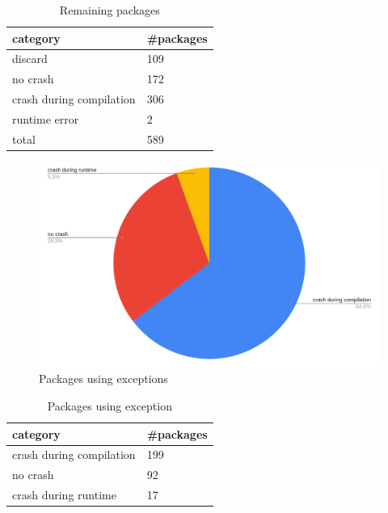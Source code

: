\documentclass[a4paper,11pt,oneside]{report}
\begin{document}
\begin{table}[h]
    \centering
    \label{table:remaining}
    \begin{tabular}{ll}
        \hline
        category                & \#packages \\
        \hline
        discard                  & 109  \\
        no crash                 & 172  \\
        crash during compilation & 306  \\
        runtime error            & 2    \\
        total                    & 589  \\
        \hline
    \end{tabular}
    \caption{Remaining packages}
\end{table}

\newpage

\begin{figure}[h]
    \centering
    \includegraphics[width=15cm]{exception.png} 
    \caption{Packages using exceptions}
    \label{fig:exception}
\end{figure}

\begin{table}[h]
    \centering
    \begin{tabular}{ll} 
        \hline
        category                & \#packages  \\ 
        \hline
        crash during compilation & 199         \\
        no crash                 & 92          \\
        crash during runtime     & 17          \\
        \hline
    \end{tabular}
    \caption{Packages using exception}
\end{table}
\end{document}
